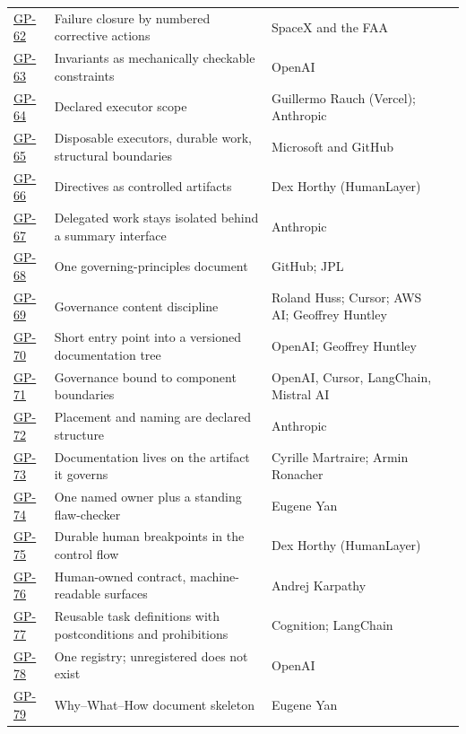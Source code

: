 \begin{longtable}{@{}l p{} p{} p{}@{}}
\hyperlink{gp-62}{GP-62} & Failure closure by numbered corrective actions & SpaceX and the FAA & \citep{ps-faa-starship,ps-smith-oft2} \\
\hyperlink{gp-63}{GP-63} & Invariants as mechanically checkable constraints & OpenAI & \citep{ps-openai-harness} \\
\hyperlink{gp-64}{GP-64} & Declared executor scope & Guillermo Rauch (Vercel); Anthropic & \citep{ps-brandom-rauch,ps-anthropic-subagents} \\
\hyperlink{gp-65}{GP-65} & Disposable executors, durable work, structural boundaries & Microsoft and GitHub & \citep{ps-microsoft-squad} \\
\hyperlink{gp-66}{GP-66} & Directives as controlled artifacts & Dex Horthy (HumanLayer) & \citep{ps-horthy-factor2} \\
\hyperlink{gp-67}{GP-67} & Delegated work stays isolated behind a summary interface & Anthropic & \citep{ps-anthropic-context} \\
\hyperlink{gp-68}{GP-68} & One governing-principles document & GitHub; JPL & \citep{ps-github-speckit,ps-jpl-d17868,ps-jpl-principles} \\
\hyperlink{gp-69}{GP-69} & Governance content discipline & Roland Huss; Cursor; AWS AI; Geoffrey Huntley & \citep{ps-huss-agentsmd,ps-cursor-rules,ps-aws-agentic,ps-huntley-loom} \\
\hyperlink{gp-70}{GP-70} & Short entry point into a versioned documentation tree & OpenAI; Geoffrey Huntley & \citep{ps-openai-harness,ps-huntley-groundhog} \\
\hyperlink{gp-71}{GP-71} & Governance bound to component boundaries & OpenAI, Cursor, LangChain, Mistral AI & \citep{ps-agentsmd,ps-openai-agentsmd,ps-cursor-rules,ps-langchain-deepagents,ps-mistral-agents} \\
\hyperlink{gp-72}{GP-72} & Placement and naming are declared structure & Anthropic & \citep{ps-anthropic-context} \\
\hyperlink{gp-73}{GP-73} & Documentation lives on the artifact it governs & Cyrille Martraire; Armin Ronacher & \citep{ps-stenberg-livingdoc,ps-ronacher-agentic} \\
\hyperlink{gp-74}{GP-74} & One named owner plus a standing flaw-checker & Eugene Yan & \citep{ps-yan-mechanisms} \\
\hyperlink{gp-75}{GP-75} & Durable human breakpoints in the control flow & Dex Horthy (HumanLayer) & \citep{ps-horthy-factor8} \\
\hyperlink{gp-76}{GP-76} & Human-owned contract, machine-readable surfaces & Andrej Karpathy & \citep{ps-karpathy-sequoia} \\
\hyperlink{gp-77}{GP-77} & Reusable task definitions with postconditions and prohibitions & Cognition; LangChain & \citep{ps-cognition-playbooks,ps-langchain-context} \\
\hyperlink{gp-78}{GP-78} & One registry; unregistered does not exist & OpenAI & \citep{ps-openai-cookbook} \\
\hyperlink{gp-79}{GP-79} & Why--What--How document skeleton & Eugene Yan & \citep{ps-yan-designdocs} \\
\bottomrule
\end{longtable}
